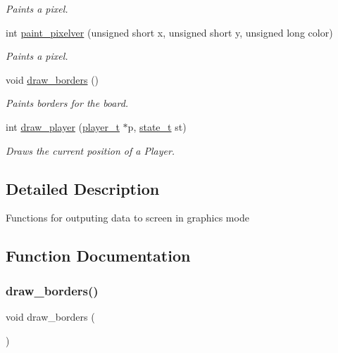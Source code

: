 \begin{DoxyCompactItemize}
\begin{DoxyCompactList}\small\item\em Paints a pixel. \end{DoxyCompactList}\item 
int \hyperlink{group__video__gr_ga3e0752b64422778fd26c0559763943b8}{paint\+\_\+pixelver} (unsigned short x, unsigned short y, unsigned long color)
\begin{DoxyCompactList}\small\item\em Paints a pixel. \end{DoxyCompactList}\item 
void \hyperlink{group__video__gr_ga4e3a822db37d5376e0c410d46bc13f95}{draw\+\_\+borders} ()
\begin{DoxyCompactList}\small\item\em Paints borders for the board. \end{DoxyCompactList}\item 
int \hyperlink{group__video__gr_gadbed0dad936e62c19d93bc8791e31527}{draw\+\_\+player} (\hyperlink{structplayer__t}{player\+\_\+t} $\ast$p, \hyperlink{group___game_gaa0aafed44fec19806d8f9ad834be1248}{state\+\_\+t} st)
\begin{DoxyCompactList}\small\item\em Draws the current position of a Player. \end{DoxyCompactList}\end{DoxyCompactItemize}


\subsection{Detailed Description}
Functions for outputing data to screen in graphics mode 

\subsection{Function Documentation}
\hypertarget{group__video__gr_ga4e3a822db37d5376e0c410d46bc13f95}{}\label{group__video__gr_ga4e3a822db37d5376e0c410d46bc13f95} 
\subsubsection{\texorpdfstring{draw\+\_\+borders()}{draw\_borders()}}
{\footnotesize\ttfamily void draw\+\_\+borders (\begin{DoxyParamCaption}{ }\end{DoxyParamCaption})}



